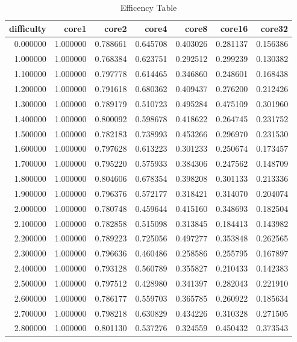 \begin{table}
\caption{Efficency Table}
\label{tab:efficiency}
\begin{tabular}{rrrrrrr}
\toprule
difficulty & core1 & core2 & core4 & core8 & core16 & core32 \\
\midrule
0.000000 & 1.000000 & 0.788661 & 0.645708 & 0.403026 & 0.281137 & 0.156386 \\
1.000000 & 1.000000 & 0.768384 & 0.623751 & 0.292512 & 0.299239 & 0.130382 \\
1.100000 & 1.000000 & 0.797778 & 0.614465 & 0.346860 & 0.248601 & 0.168438 \\
1.200000 & 1.000000 & 0.791618 & 0.680362 & 0.409437 & 0.276200 & 0.212426 \\
1.300000 & 1.000000 & 0.789179 & 0.510723 & 0.495284 & 0.475109 & 0.301960 \\
1.400000 & 1.000000 & 0.800092 & 0.598678 & 0.418622 & 0.264745 & 0.231752 \\
1.500000 & 1.000000 & 0.782183 & 0.738993 & 0.453266 & 0.296970 & 0.231530 \\
1.600000 & 1.000000 & 0.797628 & 0.613223 & 0.301233 & 0.250674 & 0.173457 \\
1.700000 & 1.000000 & 0.795220 & 0.575933 & 0.384306 & 0.247562 & 0.148709 \\
1.800000 & 1.000000 & 0.804606 & 0.678354 & 0.398208 & 0.301133 & 0.213336 \\
1.900000 & 1.000000 & 0.796376 & 0.572177 & 0.318421 & 0.314070 & 0.204074 \\
2.000000 & 1.000000 & 0.780748 & 0.459644 & 0.415160 & 0.348693 & 0.182504 \\
2.100000 & 1.000000 & 0.782858 & 0.515098 & 0.313845 & 0.184413 & 0.143982 \\
2.200000 & 1.000000 & 0.789223 & 0.725056 & 0.497277 & 0.353848 & 0.262565 \\
2.300000 & 1.000000 & 0.796636 & 0.460486 & 0.258586 & 0.255795 & 0.167897 \\
2.400000 & 1.000000 & 0.793128 & 0.560789 & 0.355827 & 0.210433 & 0.142383 \\
2.500000 & 1.000000 & 0.797512 & 0.428980 & 0.341397 & 0.282043 & 0.221910 \\
2.600000 & 1.000000 & 0.786177 & 0.559703 & 0.365785 & 0.260922 & 0.185634 \\
2.700000 & 1.000000 & 0.798218 & 0.630829 & 0.434226 & 0.310328 & 0.271505 \\
2.800000 & 1.000000 & 0.801130 & 0.537276 & 0.324559 & 0.450432 & 0.373543 \\

\end{tabular}
\end{table}
